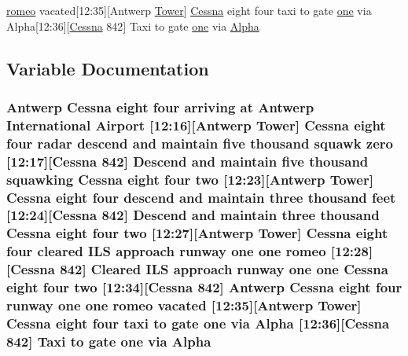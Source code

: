 \begin{DoxyCompactItemize}
\hyperlink{happyDay4ExpectedATC_8txt_a675cfa5c76a2ab697663f72c9d4e8c9a}{romeo} vacated\mbox{[}12\+:35\mbox{]}\mbox{[}Antwerp \hyperlink{test_2testOutput_2log_8txt_ade5c2a9317c664c53d015e41bdc32393}{Tower}\mbox{]} \hyperlink{test_2testOutput_2log_8txt_a3de326468ae3f37941c91ae68853a1af}{Cessna} eight four taxi to gate \hyperlink{happyDay5ExpectedATC_8txt_a1bdf675837626f29e859d1a241701d26}{one} via Alpha\mbox{[}12\+:36\mbox{]}\mbox{[}\hyperlink{test_2testOutput_2log_8txt_a3de326468ae3f37941c91ae68853a1af}{Cessna} 842\mbox{]} Taxi to gate \hyperlink{happyDay5ExpectedATC_8txt_a1bdf675837626f29e859d1a241701d26}{one} via \hyperlink{happyDay1ATC_8txt_a8a98f161ea590d9e60554c1f88b29a00}{Alpha}
\end{DoxyCompactItemize}


\subsection{Variable Documentation}
\subsubsection[{\texorpdfstring{Alpha}{Alpha}}]{\setlength{\rightskip}{0pt plus 5cm}Antwerp {\bf Cessna} eight four arriving at Antwerp International {\bf Airport} \mbox{[}12\+:16\mbox{]}\mbox{[}Antwerp {\bf Tower}\mbox{]} {\bf Cessna} eight four radar descend and maintain five {\bf thousand} squawk {\bf zero} \mbox{[}12\+:17\mbox{]}\mbox{[}{\bf Cessna} 842\mbox{]} Descend and maintain five {\bf thousand} {\bf squawking} {\bf Cessna} eight four {\bf two} \mbox{[}12\+:23\mbox{]}\mbox{[}Antwerp {\bf Tower}\mbox{]} {\bf Cessna} eight four descend and maintain three {\bf thousand} {\bf feet} \mbox{[}12\+:24\mbox{]}\mbox{[}{\bf Cessna} 842\mbox{]} Descend and maintain three {\bf thousand} {\bf Cessna} eight four {\bf two} \mbox{[}12\+:27\mbox{]}\mbox{[}Antwerp {\bf Tower}\mbox{]} {\bf Cessna} eight four cleared I\+LS approach runway {\bf one} {\bf one} {\bf romeo} \mbox{[}12\+:28\mbox{]}\mbox{[}{\bf Cessna} 842\mbox{]} Cleared I\+LS approach runway {\bf one} {\bf one} {\bf Cessna} eight four {\bf two} \mbox{[}12\+:34\mbox{]}\mbox{[}{\bf Cessna} 842\mbox{]} Antwerp {\bf Cessna} eight four runway {\bf one} {\bf one} {\bf romeo} vacated \mbox{[}12\+:35\mbox{]}\mbox{[}Antwerp {\bf Tower}\mbox{]} {\bf Cessna} eight four taxi to gate {\bf one} via Alpha \mbox{[}12\+:36\mbox{]}\mbox{[}{\bf Cessna} 842\mbox{]} Taxi to gate {\bf one} via Alpha}\hypertarget{happyDay1ATC_8txt_a8a98f161ea590d9e60554c1f88b29a00}{}\label{happyDay1ATC_8txt_a8a98f161ea590d9e60554c1f88b29a00}
